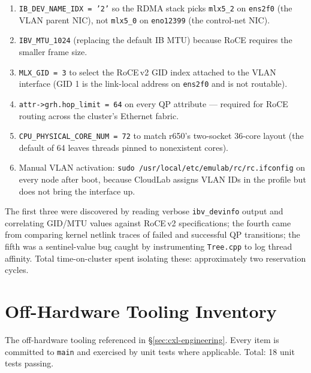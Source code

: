 \documentclass[11pt,a4paper]{article}
\begin{document}
\begin{enumerate}[nosep]
    \item \texttt{IB\_DEV\_NAME\_IDX = '2'} so the RDMA stack picks \texttt{mlx5\_2} on \texttt{ens2f0} (the VLAN parent NIC), not \texttt{mlx5\_0} on \texttt{eno12399} (the control-net NIC).
    \item \texttt{IBV\_MTU\_1024} (replacing the default IB MTU) because RoCE requires the smaller frame size.
    \item \texttt{MLX\_GID = 3} to select the RoCE\,v2 GID index attached to the VLAN interface (GID 1 is the link-local address on \texttt{ens2f0} and is not routable).
    \item \texttt{attr->grh.hop\_limit = 64} on every QP attribute --- required for RoCE routing across the cluster's Ethernet fabric.
    \item \texttt{CPU\_PHYSICAL\_CORE\_NUM = 72} to match r650's two-socket 36-core layout (the default of 64 leaves threads pinned to nonexistent cores).
    \item Manual VLAN activation: \texttt{sudo /usr/local/etc/emulab/rc/rc.ifconfig} on every node after boot, because CloudLab assigns VLAN IDs in the profile but does not bring the interface up.
\end{enumerate}

The first three were discovered by reading verbose \texttt{ibv\_devinfo} output and correlating GID/MTU values against RoCE\,v2 specifications; the fourth came from comparing kernel netlink traces of failed and successful QP transitions; the fifth was a sentinel-value bug caught by instrumenting \texttt{Tree.cpp} to log thread affinity. Total time-on-cluster spent isolating these: approximately two reservation cycles.

\section{Off-Hardware Tooling Inventory}
\label{app:tooling}

The off-hardware tooling referenced in §\ref{sec:cxl-engineering}. Every item is committed to \texttt{main} and exercised by unit tests where applicable. Total: 18 unit tests passing.
\end{document}
